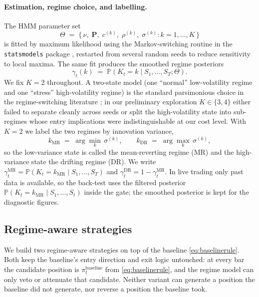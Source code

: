 \paragraph{Estimation, regime choice, and labelling.} The HMM parameter set
\begin{equation}\label{eq:thetadef}
    \Theta \;=\; \bigl\{\, \nu,\; \mathbf{P},\; c^{(k)},\; \rho^{(k)},\; \sigma^{(k)} : k=1,\ldots,K \,\bigr\}
\end{equation}
is fitted by maximum likelihood using the Markov-switching routine in the \texttt{statsmodels} package \parencite{seabold2010statsmodels}, restarted from several random seeds to reduce sensitivity to local maxima. The same fit produces the smoothed regime posteriors
\begin{equation}\label{eq:smoothedposterior}
    \gamma_t(k) \;=\; \mathbb{P}(K_t = k \mid S_1,\ldots,S_T;\Theta).
\end{equation}
We fix $K = 2$ throughout. A two-state model (one ``normal'' low-volatility regime and one ``stress'' high-volatility regime) is the standard parsimonious choice in the regime-switching literature \parencite{hamilton1989new}; in our preliminary exploration $K \in \{3, 4\}$ either failed to separate cleanly across seeds or split the high-volatility state into sub-regimes whose entry implications were indistinguishable at our cost level. With $K=2$ we label the two regimes by innovation variance,
\begin{equation}\label{eq:regimelabels}
    k_{\mathrm{MR}} \;=\; \arg\min_{k}\,\sigma^{(k)},
    \qquad
    k_{\mathrm{DR}} \;=\; \arg\max_{k}\,\sigma^{(k)},
\end{equation}
so the low-variance state is called the mean-reverting regime (MR) and the high-variance state the drifting regime (DR). We write $\gamma_t^{\mathrm{MR}} = \mathbb{P}(K_t = k_{\mathrm{MR}} \mid S_1,\ldots,S_T)$ and $\gamma_t^{\mathrm{DR}} = 1 - \gamma_t^{\mathrm{MR}}$. In live trading only past data is available, so the back-test uses the filtered posterior $\mathbb{P}(K_t = k_{\mathrm{MR}} \mid S_1,\ldots,S_t)$ inside the gate; the smoothed posterior is kept for the diagnostic figures.

\subsection{Regime-aware strategies}\label{sec:regimestrategies}

We build two regime-aware strategies on top of the baseline \eqref{eq:baselinerule}. Both keep the baseline's entry direction and exit logic untouched: at every bar the candidate position is $\pi_t^{\mathrm{baseline}}$ from \eqref{eq:baselinerule}, and the regime model can only veto or attenuate that candidate. Neither variant can generate a position the baseline did not generate, nor reverse a position the baseline took.

